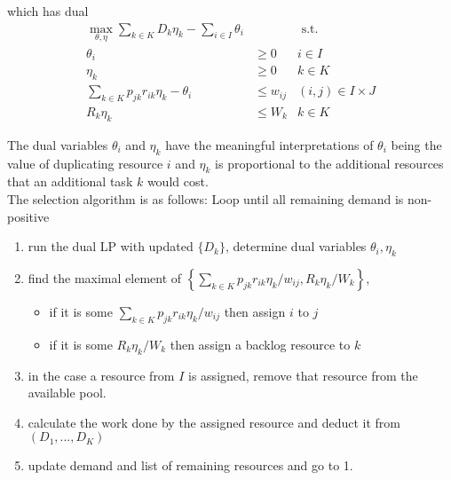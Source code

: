 \documentclass[12pt]{article}
\begin{document}
which has dual
\begin{align*}
\max_{\theta,\eta} \sum_{k\in K} D_k \eta_k -\sum_{i \in I} \theta_i  & &\text{ s.t. }\\
\theta_i &\ge 0& i \in I\\
\eta_k &\ge 0& k \in K\\
\sum_{k \in K}p_{jk}r_{ik}\eta_k -\theta_i&\le w_{ij} & (i,j) \in I \times J\\
R_k \eta_k & \le W_k & k \in K
\end{align*}

The dual variables $\theta_i$ and $\eta_k$ have the meaningful interpretations of $\theta_i$ being the value of duplicating resource $i$ and $\eta_k$ is proportional to the additional resources that an additional task $k$ would cost.\\

The selection algorithm is as follows: Loop until all remaining demand is non-positive
\begin{enumerate}
\item run the dual LP with updated $\{D_k\}$, determine dual variables $\theta_i,\eta_k$
\item find the maximal element of $\left\{\sum_{k \in K}p_{jk}r_{ik}\eta_k/w_{ij},R_k\eta_k/W_k\right\}$,
\begin{itemize}
\item if it is some $\sum_{k \in K}p_{jk}r_{ik}\eta_k/w_{ij}$ then assign $i$ to $j$
\item if it is some $R_k\eta_k/W_k$ then assign a backlog resource to $k$
\end{itemize}
\item in the case a resource from $I$ is assigned, remove that resource from the available pool.
\item calculate the work done by the assigned resource and deduct it from $(D_1,...,D_K)$
\item update demand and list of remaining resources and go to 1.
\end{enumerate}
\end{document}
